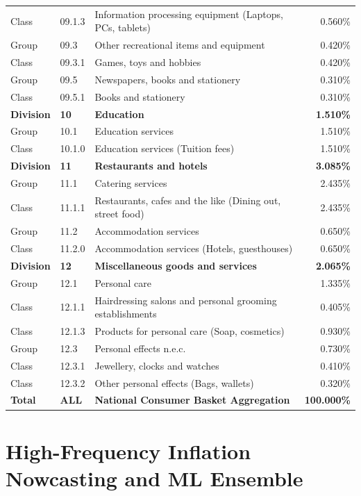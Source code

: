 \documentclass[11pt,a4paper,oneside]{article}
\begin{document}
\begin{longtable}{llp{7.5cm}r}
Class & 09.1.3 & Information processing equipment (Laptops, PCs, tablets) & 0.560\% \\
Group & 09.3 & Other recreational items and equipment & 0.420\% \\
Class & 09.3.1 & Games, toys and hobbies & 0.420\% \\
Group & 09.5 & Newspapers, books and stationery & 0.310\% \\
Class & 09.5.1 & Books and stationery & 0.310\% \\
\midrule
\textbf{Division} & \textbf{10} & \textbf{Education} & \textbf{1.510\%} \\
Group & 10.1 & Education services & 1.510\% \\
Class & 10.1.0 & Education services (Tuition fees) & 1.510\% \\
\midrule
\textbf{Division} & \textbf{11} & \textbf{Restaurants and hotels} & \textbf{3.085\%} \\
Group & 11.1 & Catering services & 2.435\% \\
Class & 11.1.1 & Restaurants, cafes and the like (Dining out, street food) & 2.435\% \\
Group & 11.2 & Accommodation services & 0.650\% \\
Class & 11.2.0 & Accommodation services (Hotels, guesthouses) & 0.650\% \\
\midrule
\textbf{Division} & \textbf{12} & \textbf{Miscellaneous goods and services} & \textbf{2.065\%} \\
Group & 12.1 & Personal care & 1.335\% \\
Class & 12.1.1 & Hairdressing salons and personal grooming establishments & 0.405\% \\
Class & 12.1.3 & Products for personal care (Soap, cosmetics) & 0.930\% \\
Group & 12.3 & Personal effects n.e.c. & 0.730\% \\
Class & 12.3.1 & Jewellery, clocks and watches & 0.410\% \\
Class & 12.3.2 & Other personal effects (Bags, wallets) & 0.320\% \\
\midrule
\textbf{Total} & \textbf{ALL} & \textbf{National Consumer Basket Aggregation} & \textbf{100.000\%} \\
\bottomrule
\end{longtable}

\newpage

\section{High-Frequency Inflation Nowcasting and ML Ensemble}
\end{document}
